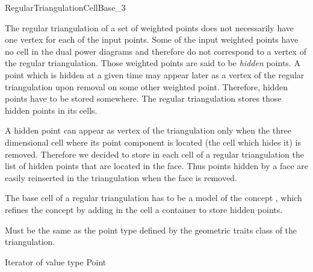 

\begin{ccRefConcept}{RegularTriangulationCellBase_3}


\ccDefinition
  
The regular triangulation of a set of weighted points does not
necessarily
have one vertex for each of the input points. Some of the input
weighted points have no cell in the dual power diagrams
and therefore do not correspond to a vertex of the regular
triangulation.
Those weighted points are said to be {\it hidden} points.
A  point which is hidden at a given time may appear later as a vertex of
the regular triangulation upon removal on some other weighted point.
Therefore, hidden points have to be stored somewhere.
The regular triangulation stores those hidden points
in its cells.

A hidden point can appear as vertex of the triangulation
only when the
three dimensional cell where its point component is located
(the cell which hides it)
is removed. Therefore we decided to store 
in each cell of a regular triangulation
the list of hidden points that are located in the face.
Thus  points hidden by a face are easily reinserted in the triangulation
when the face is removed.

The base cell of a regular triangulation 
has to be a model
of the concept \ccRefName, which refines
the concept  by adding
in the cell  a container to store hidden points.

\ccRefines
{}

\ccTypes
{}
{Must be the same as the point type 
defined by the geometric traits class of the triangulation.}

\ccTypes
{}
{Iterator of value type Point}





\end{ccRefConcept}
